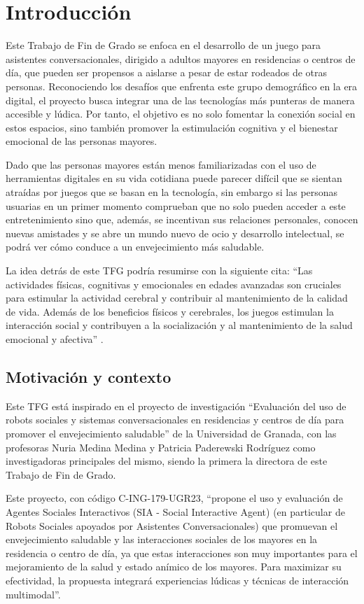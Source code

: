 \section{Introducción}
Este Trabajo de Fin de Grado se enfoca en el desarrollo de un juego para asistentes conversacionales, dirigido a adultos mayores en residencias o centros de día, que pueden ser propensos a aislarse a pesar de estar rodeados de otras personas. Reconociendo los desafíos que enfrenta este grupo demográfico en la era digital, el proyecto busca integrar una de las tecnologías más punteras de manera accesible y lúdica. Por tanto, el objetivo es no solo fomentar la conexión social en estos espacios, sino también promover la estimulación cognitiva y el bienestar emocional de las personas mayores.

Dado que las personas mayores están menos familiarizadas con el uso de herramientas digitales en su vida cotidiana puede parecer difícil que se sientan atraídas por juegos que se basan en la tecnología, sin embargo si las personas usuarias en un primer momento comprueban que no solo pueden acceder a este entretenimiento sino que, además, se incentivan sus relaciones personales, conocen nuevas amistades y se abre un mundo nuevo de ocio y desarrollo intelectual, se podrá ver cómo conduce a un envejecimiento más saludable.

La idea detrás de este TFG podría resumirse con la siguiente cita: \enquote{Las actividades físicas, cognitivas y emocionales en edades avanzadas son cruciales para estimular la actividad cerebral y contribuir al mantenimiento de la calidad de vida. Además de los beneficios físicos y cerebrales, los juegos estimulan la interacción social y contribuyen a la socialización y al mantenimiento de la salud emocional y afectiva} \parencite{intro3}.


\subsection{Motivación y contexto}

Este TFG está inspirado en el proyecto de investigación \enquote{Evaluación del uso de robots sociales y sistemas conversacionales en residencias y centros de día para promover el envejecimiento saludable} de la Universidad de Granada, con las profesoras Nuria Medina Medina y Patricia Paderewski Rodríguez como investigadoras principales del mismo, siendo la primera la directora de este Trabajo de Fin de Grado.

Este proyecto, con código C-ING-179-UGR23, \enquote{propone el uso y evaluación de Agentes Sociales Interactivos (SIA - Social Interactive Agent) (en particular de Robots Sociales apoyados por Asistentes Conversacionales) que promuevan el envejecimiento saludable y las interacciones sociales de los mayores en la residencia o centro de día, ya que estas interacciones son muy importantes para el mejoramiento de la salud y estado anímico de los mayores. Para maximizar su efectividad, la propuesta integrará experiencias lúdicas y técnicas de interacción multimodal}. 

